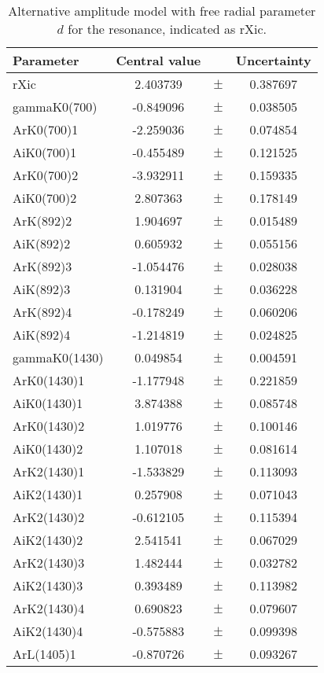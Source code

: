 \clearpage

\begin{table}
\centering
\caption{Alternative amplitude model with free radial parameter $d$ for the \Xic resonance, indicated as rXic. \label{tab:alternative_last}}
\begin{tiny}
\begin{tabular}{lccc}
\toprule
Parameter & Central value & & Uncertainty\\
\midrule 
rXic & 2.403739 & $\pm$ & 0.387697 \\
gammaK0(700) & -0.849096 & $\pm$ & 0.038505 \\
ArK0(700)1 & -2.259036 & $\pm$ & 0.074854 \\
AiK0(700)1 & -0.455489 & $\pm$ & 0.121525 \\
ArK0(700)2 & -3.932911 & $\pm$ & 0.159335 \\
AiK0(700)2 & 2.807363 & $\pm$ & 0.178149 \\
ArK(892)2 & 1.904697 & $\pm$ & 0.015489 \\
AiK(892)2 & 0.605932 & $\pm$ & 0.055156 \\
ArK(892)3 & -1.054476 & $\pm$ & 0.028038 \\
AiK(892)3 & 0.131904 & $\pm$ & 0.036228 \\
ArK(892)4 & -0.178249 & $\pm$ & 0.060206 \\
AiK(892)4 & -1.214819 & $\pm$ & 0.024825 \\
gammaK0(1430) & 0.049854 & $\pm$ & 0.004591 \\
ArK0(1430)1 & -1.177948 & $\pm$ & 0.221859 \\
AiK0(1430)1 & 3.874388 & $\pm$ & 0.085748 \\
ArK0(1430)2 & 1.019776 & $\pm$ & 0.100146 \\
AiK0(1430)2 & 1.107018 & $\pm$ & 0.081614 \\
ArK2(1430)1 & -1.533829 & $\pm$ & 0.113093 \\
AiK2(1430)1 & 0.257908 & $\pm$ & 0.071043 \\
ArK2(1430)2 & -0.612105 & $\pm$ & 0.115394 \\
AiK2(1430)2 & 2.541541 & $\pm$ & 0.067029 \\
ArK2(1430)3 & 1.482444 & $\pm$ & 0.032782 \\
AiK2(1430)3 & 0.393489 & $\pm$ & 0.113982 \\
ArK2(1430)4 & 0.690823 & $\pm$ & 0.079607 \\
AiK2(1430)4 & -0.575883 & $\pm$ & 0.099398 \\
ArL(1405)1 & -0.870726 & $\pm$ & 0.093267 \\

\end{tabular}
\end{tiny}
\end{table}
